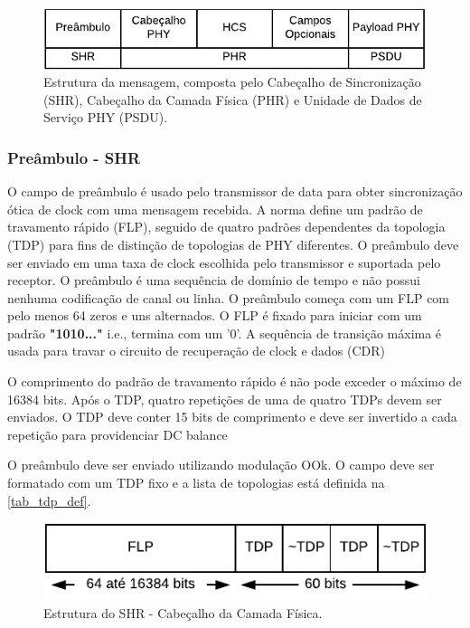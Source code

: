	\begin{figure}[htb]
		\caption{\label{fig_ppdu_frame} Estrutura da mensagem, composta pelo Cabeçalho de Sincronização (SHR), Cabeçalho da Camada Física (PHR) e Unidade de Dados de Serviço PHY (PSDU).}
		\centering
		\includegraphics[width=0.5\textheight]{frame/PPDU.pdf}
	\end{figure}
	
	\subsubsection{Preâmbulo - SHR}
	
	O campo de preâmbulo é usado pelo transmissor de data para obter sincronização ótica de clock com uma mensagem recebida. A norma define um padrão de travamento rápido (FLP), seguido de quatro padrões dependentes da topologia (TDP) para fins de distinção de topologias de PHY diferentes. O preâmbulo deve ser enviado em uma taxa de clock escolhida pelo transmissor e suportada pelo receptor. O preâmbulo é uma sequência de domínio de tempo e não possui nenhuma codificação de canal ou linha.
	O preâmbulo começa com um FLP com pelo menos 64 zeros e uns alternados. O FLP é fixado para iniciar com um padrão  \textbf{"1010..."} i.e., termina com um '0'. A sequência de transição máxima é usada para travar o circuito de recuperação de clock e dados (CDR) 
	
	O comprimento do padrão de travamento rápido é não pode exceder o máximo de 16384 bits. Após o TDP, quatro repetições de uma de quatro TDPs devem ser enviados. O TDP deve conter 15 bits de comprimento e deve ser invertido a cada repetição para providenciar DC balance
	
	O preâmbulo deve ser enviado utilizando modulação OOk. O campo deve ser formatado com um TDP fixo e a lista de topologias está definida na  \autoref{tab_tdp_def}.
	
	\begin{figure}[htb]
		\caption{\label{fig_shr_frame} Estrutura do SHR - Cabeçalho da Camada Física.}
		\centering
		\includegraphics[width=0.5\textheight]{frame/SHR.pdf}
	\end{figure}
	
